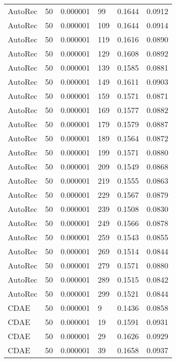 \begin{tabular}{llrlrr}
 AutoRec &   50 &  0.000001 &    99 &  0.1644 &       0.0912 \\
 AutoRec &   50 &  0.000001 &   109 &  0.1644 &       0.0914 \\
 AutoRec &   50 &  0.000001 &   119 &  0.1616 &       0.0890 \\
 AutoRec &   50 &  0.000001 &   129 &  0.1608 &       0.0892 \\
 AutoRec &   50 &  0.000001 &   139 &  0.1585 &       0.0881 \\
 AutoRec &   50 &  0.000001 &   149 &  0.1611 &       0.0903 \\
 AutoRec &   50 &  0.000001 &   159 &  0.1571 &       0.0871 \\
 AutoRec &   50 &  0.000001 &   169 &  0.1577 &       0.0882 \\
 AutoRec &   50 &  0.000001 &   179 &  0.1579 &       0.0887 \\
 AutoRec &   50 &  0.000001 &   189 &  0.1564 &       0.0872 \\
 AutoRec &   50 &  0.000001 &   199 &  0.1571 &       0.0880 \\
 AutoRec &   50 &  0.000001 &   209 &  0.1549 &       0.0868 \\
 AutoRec &   50 &  0.000001 &   219 &  0.1555 &       0.0863 \\
 AutoRec &   50 &  0.000001 &   229 &  0.1567 &       0.0879 \\
 AutoRec &   50 &  0.000001 &   239 &  0.1508 &       0.0830 \\
 AutoRec &   50 &  0.000001 &   249 &  0.1566 &       0.0878 \\
 AutoRec &   50 &  0.000001 &   259 &  0.1543 &       0.0855 \\
 AutoRec &   50 &  0.000001 &   269 &  0.1514 &       0.0844 \\
 AutoRec &   50 &  0.000001 &   279 &  0.1571 &       0.0880 \\
 AutoRec &   50 &  0.000001 &   289 &  0.1515 &       0.0842 \\
 AutoRec &   50 &  0.000001 &   299 &  0.1521 &       0.0844 \\
    CDAE &   50 &  0.000001 &     9 &  0.1436 &       0.0858 \\
    CDAE &   50 &  0.000001 &    19 &  0.1591 &       0.0931 \\
    CDAE &   50 &  0.000001 &    29 &  0.1626 &       0.0929 \\
    CDAE &   50 &  0.000001 &    39 &  0.1658 &       0.0937 \\

\end{tabular}
